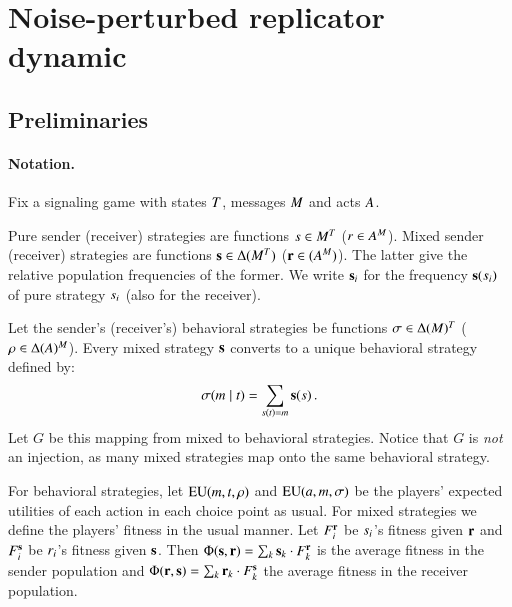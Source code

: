 \section{Noise-perturbed replicator dynamic}

\subsection{Preliminaries}

\paragraph{Notation.} Fix a signaling game with states $T$,
messages $M$ and acts $A$. %

Pure sender (receiver) strategies are functions $s \in
M^T$ ($r \in A^M$). Mixed sender (receiver)
strategies are functions $\mathrm{\mathbf{s}} \in \Delta(M^T)$
($\mathrm{\mathbf{r}} \in (A^M)$). The latter give the relative
population frequencies of the former. We write $\mathrm{\mathbf{s}}_i$ for the
frequency $\mathrm{\mathbf{s}}(s_i)$ of pure strategy $s_i$ (also for
the receiver).

Let the sender's (receiver's) behavioral strategies be functions
$\sigma \in \Delta(M)^T$ ($\rho \in
\Delta(A)^M$). Every mixed strategy $\mathrm{\mathbf{s}}$ converts to a
unique behavioral strategy defined by:
\begin{align*}
  \sigma(m \mid t) = \sum_{s(t) = m} \mathrm{\mathbf{s}}(s)\,.
\end{align*} 
Let $G$ be this mapping from mixed to behavioral strategies. Notice
that $G$ is \emph{not} an injection, as many mixed strategies map onto
the same behavioral strategy.

For behavioral strategies, let $\mathrm{EU}(m, t, \rho)$ and
$\mathrm{EU}(a, m, \sigma)$ be the players' expected utilities of
each action in each choice point as usual. For mixed strategies we
define the players' fitness in the usual manner. Let $F_i^{\mathrm{\mathbf{r}}}$
be $s_i$'s fitness given $\mathrm{\mathbf{r}}$ and $F_i^{\mathrm{\mathbf{s}}}$ be
$r_i$'s fitness given $\mathrm{\mathbf{s}}$. Then $\Phi(\mathrm{\mathbf{s}},\mathrm{\mathbf{r}}) =
\sum_{k} \mathrm{\mathbf{s}}_k \cdot F_k^{\mathrm{\mathbf{r}}}$ is the average fitness in the
sender population and $\Phi(\mathrm{\mathbf{r}},\mathrm{\mathbf{s}}) = \sum_{k} \mathrm{\mathbf{r}}_k
\cdot F_k^{\mathrm{\mathbf{s}}}$ the average fitness in the receiver population.

